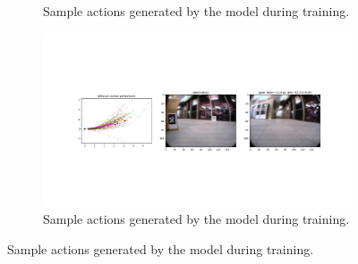 \documentclass[12pt]{article}
\begin{document}
\begin{figure}[H]
\begin{subfigure}[b]{0.48\textwidth}
        \caption{Sample actions generated by the model during training.}
        \label{fig:train_action_samples_3}
    \end{subfigure}
    \hfill
    \begin{subfigure}[b]{0.48\textwidth}
        \centering
        \includegraphics[width=\textwidth]{images/train_action_samples_4.png}
        \caption{Sample actions generated by the model during training.}
        \label{fig:train_action_samples_4}
    \end{subfigure}
    \hfill
    \end{figure}
\end{document}
